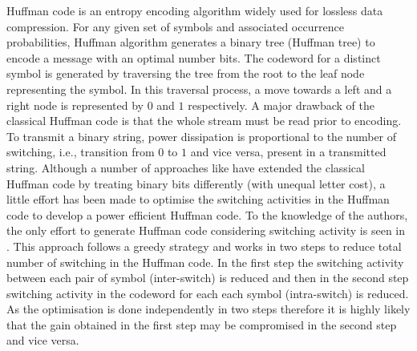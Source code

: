 \documentclass[preprint,12pt]{elsarticle}
\begin{document}
Huffman code \cite{Huff51} is an entropy
encoding algorithm widely used for lossless data compression. For any given set of symbols and associated occurrence probabilities, Huffman algorithm generates a binary tree (Huffman tree) to encode a message with an optimal number bits. The codeword for a distinct symbol is generated by traversing the tree from the root to
the leaf node representing the symbol. In this traversal process, a move towards a left and a right node is represented by $0$ and $1$ respectively. A major drawback of the classical Huffman code is that the whole stream must be read prior to encoding. To transmit a binary string, power dissipation  is proportional to the number of switching, i.e., transition from $0$ to $1$ and vice versa, present in a transmitted string. Although a number of approaches like \cite{Gol12,Kab14} have extended the classical Huffman code by treating binary bits differently (with unequal letter cost), a little effort has been made to optimise the switching activities in the Huffman code to develop a power efficient Huffman code. To the knowledge of the authors, the only effort to generate Huffman code considering switching activity is seen in \cite{Chen06}. This approach follows a greedy strategy and works in two steps to reduce total number of switching in the Huffman code. In the first step the switching activity between each pair of symbol (inter-switch) is reduced and then in the second step switching activity in the codeword for each each symbol (intra-switch) is reduced. As the optimisation is done independently in two steps therefore it is highly likely that the gain obtained in the first step may be compromised in the second step and vice versa. 
\end{document}
